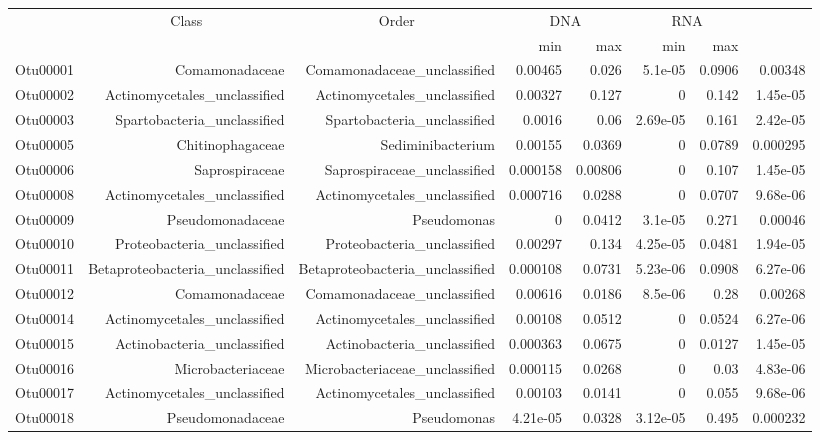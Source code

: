 \documentclass[]{article}
\begin{document}
\begin{table}[ht]
\centering
\begin{tabular}{crrrrrrr}
  \hline
  & \multicolumn{1}{c}{Class} & \multicolumn{1}{c}{Order} & 
                      \multicolumn{2}{c}{DNA} & \multicolumn{2}{c}{RNA} \\
 & &  & min & max & min & max \\
 \hline
Otu00001 & Comamonadaceae & Comamonadaceae\_unclassified & 0.00465 & 0.026 & 5.1e-05 & 0.0906 & 0.00348 \\ 
  Otu00002 & Actinomycetales\_unclassified & Actinomycetales\_unclassified & 0.00327 & 0.127 & 0 & 0.142 & 1.45e-05 \\ 
  Otu00003 & Spartobacteria\_unclassified & Spartobacteria\_unclassified & 0.0016 & 0.06 & 2.69e-05 & 0.161 & 2.42e-05 \\ 
  Otu00005 & Chitinophagaceae & Sediminibacterium & 0.00155 & 0.0369 & 0 & 0.0789 & 0.000295 \\ 
  Otu00006 & Saprospiraceae & Saprospiraceae\_unclassified & 0.000158 & 0.00806 & 0 & 0.107 & 1.45e-05 \\ 
  Otu00008 & Actinomycetales\_unclassified & Actinomycetales\_unclassified & 0.000716 & 0.0288 & 0 & 0.0707 & 9.68e-06 \\ 
  Otu00009 & Pseudomonadaceae & Pseudomonas & 0 & 0.0412 & 3.1e-05 & 0.271 & 0.00046 \\ 
  Otu00010 & Proteobacteria\_unclassified & Proteobacteria\_unclassified & 0.00297 & 0.134 & 4.25e-05 & 0.0481 & 1.94e-05 \\ 
  Otu00011 & Betaproteobacteria\_unclassified & Betaproteobacteria\_unclassified & 0.000108 & 0.0731 & 5.23e-06 & 0.0908 & 6.27e-06 \\ 
  Otu00012 & Comamonadaceae & Comamonadaceae\_unclassified & 0.00616 & 0.0186 & 8.5e-06 & 0.28 & 0.00268 \\ 
  Otu00014 & Actinomycetales\_unclassified & Actinomycetales\_unclassified & 0.00108 & 0.0512 & 0 & 0.0524 & 6.27e-06 \\ 
  Otu00015 & Actinobacteria\_unclassified & Actinobacteria\_unclassified & 0.000363 & 0.0675 & 0 & 0.0127 & 1.45e-05 \\ 
  Otu00016 & Microbacteriaceae & Microbacteriaceae\_unclassified & 0.000115 & 0.0268 & 0 & 0.03 & 4.83e-06 \\ 
  Otu00017 & Actinomycetales\_unclassified & Actinomycetales\_unclassified & 0.00103 & 0.0141 & 0 & 0.055 & 9.68e-06 \\ 
  Otu00018 & Pseudomonadaceae & Pseudomonas & 4.21e-05 & 0.0328 & 3.12e-05 & 0.495 & 0.000232 \\ 

\end{tabular}
\end{table}
\end{document}
